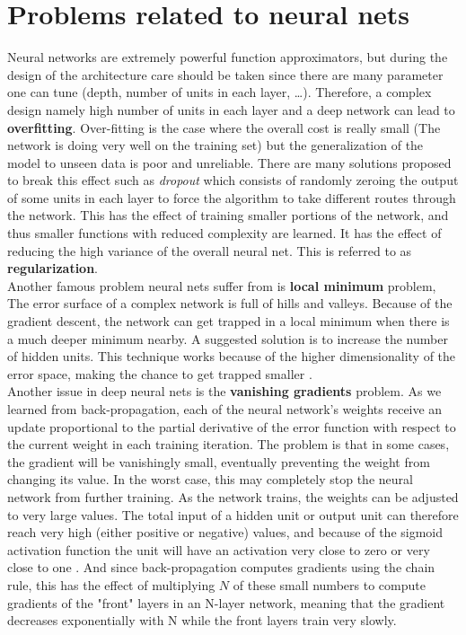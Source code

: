 \section{Problems related to neural nets}

Neural networks are extremely powerful function approximators, but during the design of the architecture care should be taken since there are many parameter one can tune (depth, number of units in each layer, \ldots). Therefore, a complex design namely high number of units in each layer and a deep network can lead to \textbf{overfitting}. Over-fitting is the case where the overall cost is really small (The network is doing very well on the training set) but the generalization of the model to unseen data is poor and unreliable. There are many solutions proposed to break this effect such as \emph{dropout} which consists of randomly zeroing the output of some units in each layer to force the algorithm to take different routes through the network. This has the effect of training smaller portions of the network, and thus smaller functions with reduced complexity are learned. It has the effect of reducing the high variance of the overall neural net. This is referred to as \textbf{regularization}. \\
Another famous problem neural nets suffer from is \textbf{local minimum} problem, The error surface of a complex network is full of hills and valleys. Because of the gradient descent, the network can get trapped in a local minimum when there is a much deeper minimum nearby. A suggested solution is to increase the number of hidden units. This technique works because of the higher dimensionality of the error space, making the chance to get trapped smaller \cite{atnn}. \\
Another issue in deep neural nets is the \textbf{vanishing gradients} problem. As we learned from back-propagation, each of the neural network's weights receive an update proportional to the partial derivative of the error function with respect to the current weight in each training iteration. The problem is that in some cases, the gradient will be vanishingly small, eventually preventing the weight from changing its value. In the worst case, this may completely stop the neural network from further training. As the network trains, the weights can be adjusted to very large values. The total input of a hidden unit or output unit can therefore reach very high (either positive or
negative) values, and because of the sigmoid activation function the unit will have an activation very close to zero or very close to one \cite{atnn}. And since back-propagation computes gradients using the chain rule, this has the effect of multiplying $N$ of these small numbers to compute gradients of the "front" layers in an N-layer network, meaning that the gradient decreases exponentially with N while the front layers train very slowly.\\
